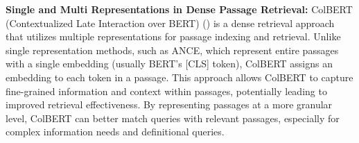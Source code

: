 \textbf{Single and Multi Representations in Dense Passage Retrieval:} ColBERT (Contextualized Late Interaction over BERT) (\cite{khattab2020colbert}) is a dense retrieval approach that utilizes multiple representations for passage indexing and retrieval. Unlike single representation methods, such as ANCE, which represent entire passages with a single embedding (usually BERT's [CLS] token), ColBERT assigns an embedding to each token in a passage. This approach allows ColBERT to capture fine-grained information and context within passages, potentially leading to improved retrieval effectiveness. By representing passages at a more granular level, ColBERT can better match queries with relevant passages, especially for complex information needs and definitional queries.